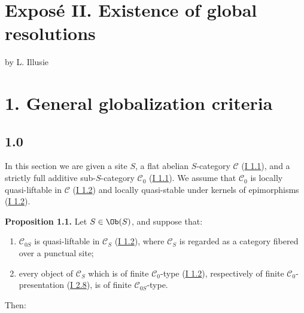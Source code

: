 \section*{Exposé II. Existence of global resolutions}
\begin{center}
by L. Illusie
\end{center}

\section*{1. General globalization criteria}

\subsection*{1.0}
In this section we are given a site $S$, a flat abelian $S$-category $\mathcal C$ (\hyperlink{sga6.e01.sec.1.1}{I 1.1}), and a strictly full additive sub-$S$-category $\mathcal C_0$ (\hyperlink{sga6.e01.sec.1.1}{I 1.1}). We assume that $\mathcal C_0$ is locally quasi-liftable in $\mathcal C$ (\hyperlink{sga6.e01.sec.1.2}{I 1.2}) and locally quasi-stable under kernels of epimorphisms (\hyperlink{sga6.e01.sec.1.2}{I 1.2}).

\textbf{Proposition 1.1.} Let $S\in \Ob(S)$, and suppose that:
\begin{enumerate}[label=(\roman*)]
\item $\mathcal C_{0S}$ is quasi-liftable in $\mathcal C_S$ (\hyperlink{sga6.e01.sec.1.2}{I 1.2}), where $\mathcal C_S$ is regarded as a category fibered over a punctual site;
\item every object of $\mathcal C_S$ which is of finite $\mathcal C_0$-type (\hyperlink{sga6.e01.sec.1.2}{I 1.2}), respectively of finite $\mathcal C_0$-presentation (\hyperlink{sga6.e01.def.2-8}{I 2.8}), is of finite $\mathcal C_{0S}$-type.
\end{enumerate}
Then:

